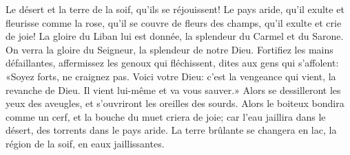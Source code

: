 Le désert et la terre de la soif, qu’ils se réjouissent!
	Le pays aride, qu’il exulte et fleurisse comme la rose,
	qu’il se couvre de fleurs des champs, qu’il exulte et crie de joie!
La gloire du Liban lui est donnée,
	la splendeur du Carmel et du Sarone.
	On verra la gloire du Seigneur, la splendeur de notre Dieu.
Fortifiez les mains défaillantes, affermissez les genoux qui fléchissent,
	dites aux gens qui s’affolent:
	«Soyez forts, ne craignez pas.
Voici votre Dieu: c’est la vengeance qui vient, la revanche de Dieu.
	Il vient lui-même et va vous sauver.»
Alors se dessilleront les yeux des aveugles,
	et s’ouvriront les oreilles des sourds.
Alors le boiteux bondira comme un cerf,
	et la bouche du muet criera de joie;
	car l’eau jaillira dans le désert,
	des torrents dans le pays aride.
La terre brûlante se changera en lac,
	la région de la soif, en eaux jaillissantes.
